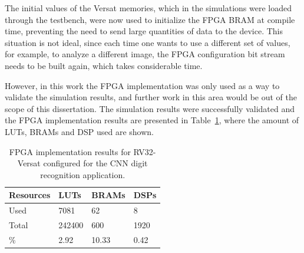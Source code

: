 The initial values of the Versat memories, which in the simulations were loaded
through the testbench, were now used to initialize the \ac{FPGA} \ac{BRAM} at
compile time, preventing the need to send large quantities of data to the
device. This situation is not ideal, since each time one wants to use a
different set of values, for example, to analyze a different image, the \ac{FPGA}
configuration bit stream needs to be built again, which takes considerable time.

However, in this work the \ac{FPGA} implementation was only used as a way to validate
the simulation results, and further work in this area would be out
of the scope of this dissertation. The simulation results were successfully
validated and the \ac{FPGA} implementation results are presented in 
Table~\ref{tab:resources}, where the amount of \ac{LUT}s, \ac{BRAM}s and \ac{DSP} used 
are shown.

\begin{table}[!htb]
	\renewcommand{\arraystretch}{1.2} %
	\caption{FPGA implementation results for RV32-Versat configured for the CNN
		digit recognition application.}
	\label{tab:resources}
	\centering
	\begin{tabular}{llll}
		\toprule
		Resources & LUTs   & BRAMs & DSPs\\
		\midrule
		Used      & 7081   & 62    & 8    \\
		Total     & 242400 & 600   & 1920 \\
		\midrule
		\%        & 2.92   & 10.33 & 0.42 \\
		\bottomrule
	\end{tabular}
\end{table}

